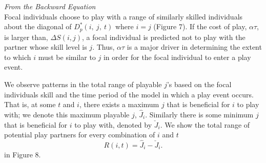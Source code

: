 \documentclass[12pt, letterpaper, fleqn]{article}
\begin{document}
	\noindent \textit{From the Backward Equation}\\
	Focal individuals choose to play with a range of similarly skilled individuals about the diagonal of $D_p^*(i,~j,~t)$ where $i=j$ (Figure 7).
	If the cost of play, $\alpha \tau$, is larger than, $\Delta S(i,j)$, a focal individual is predicted not to play with the partner whose skill level is $j$.
	Thus, $\alpha \tau$ is a major driver in determining the extent to which $i$ must be similar to $j$ in order for the focal individual to enter a play event. 
	
	
	We observe patterns in the total range of playable $j$'s based on the focal individuals skill and the time period of the model in which a play event occurs. %
	That is, at some $t$ and $i$, there exists a maximum $j$ that is beneficial for $i$ to play with; we denote this maximum playable $j$, $\hat J_{i}$.
	Similarly there is some minimum $j$ that is beneficial for $i$ to play with, denoted by $\check J_{i}$.
	We show the total range of potential play partners for every combination of $i$ and $t$       
	\begin{equation}
	R(i,t)=\hat J_i - \check J_{i}.
	\end{equation}
	in Figure 8.
	
	
\end{document}
